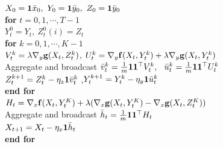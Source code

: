 \begin{algorithm*}[t]  
\caption{Distributed F${}^2$BA $\left(\bar x_0,\bar y_0, \eta_x,\eta_y,\eta_z, \lambda, T,K\right)$} \label{alg:CF2BA}
\begin{algorithmic}[1] 
\STATE $ X_0 = {\bf{1}}  \bar x_0, ~ Y_0 = {\bf{1}}  \bar y_0,~ Z_0 = {\bf{1}}  \bar y_0$ \\[1mm]
\STATE \textbf{for} $ t =0,1,\cdots,T-1 $ \\[1mm]
\STATE \quad $ Y_t^0 =  Y_{t}, ~ Z_t^0(i) = Z_{t}$ \\[1mm]
\STATE \quad \textbf{for} $ k =0,1,\cdots,K-1$ \\[1mm]
\STATE \quad \quad  $ V_t^{k} = \lambda \nabla_y {\bf{g}}(X_t, Z_t^k)$, \quad  $U_t^{k} =  \nabla_y {\bf{f}}(X_t,Y_t^k) +  \lambda  \nabla_y {\bf{g}}(X_t,Y_t^k) $ \\[1mm]
\STATE \quad \quad Aggregate and broadcast $\bar v_t^{k} = \frac{1}{m} {\bf{1}} {\bf{1}}^\top V_t^k, $~ $\bar u_t^{k} = \frac{1}{m} {\bf{1}}   {\bf{1}}^\top U_t^k$ \\[1mm]
\STATE \quad \quad  $ Z_t^{k+1} = Z_t^k - \eta_z {\bf{1}}   \bar v_t^k   $ ,\quad  $ Y_t^{k+1} = Y_t^k - \eta_y {\bf{1}} \bar u_t^k   $ \\[1mm]
\STATE \quad \textbf{end for} \\[1mm]
\STATE \quad $ H_t= \nabla_x {\bf{f}}(X_t,Y_{t}^K) + \lambda ( \nabla_x {\bf{g}}(X_t,Y_{t}^K) - \nabla_x {\bf{g}}(X_t,Z_{t}^K) )$ \\[1mm]
\STATE \quad Aggregate and broadcast $\bar h_t = \frac{1}{m} {\bf{1}}   {\bf{1}}^\top H_t$ \\[1mm]
\STATE \quad $X_{t+1} = X_t -  \eta_x  {\bf{1}}  \bar h_t$ \\[1mm]
\STATE \textbf{end for} \\[1mm]
\end{algorithmic}
\end{algorithm*}



